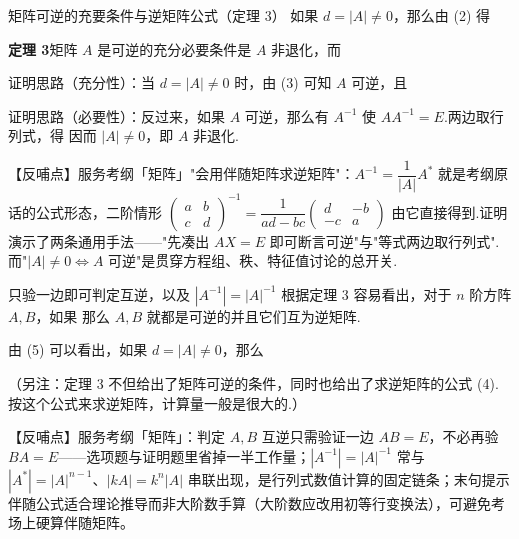 \begin{fdeep}{矩阵可逆的充要条件与逆矩阵公式（定理 3）}
如果 $d=|A|\ne 0$，那么由 (2) 得

\textbf{定理 3}\quad 矩阵 $A$ 是可逆的充分必要条件是 $A$ 非退化，而

证明思路（充分性）：当 $d=|A|\ne 0$ 时，由 (3) 可知 $A$ 可逆，且

证明思路（必要性）：反过来，如果 $A$ 可逆，那么有 $A^{-1}$ 使 $AA^{-1}=E$.两边取行列式，得
因而 $|A|\ne 0$，即 $A$ 非退化.

【反哺点】服务考纲「矩阵」"会用伴随矩阵求逆矩阵"：$A^{-1}=\dfrac{1}{|A|}A^{*}$ 就是考纲原话的公式形态，二阶情形 $\begin{pmatrix}a&b\\c&d\end{pmatrix}^{-1}=\dfrac{1}{ad-bc}\begin{pmatrix}d&-b\\-c&a\end{pmatrix}$ 由它直接得到.证明演示了两条通用手法——"先凑出 $AX=E$ 即可断言可逆"与"等式两边取行列式".而"$|A|\ne0\Leftrightarrow A$ 可逆"是贯穿方程组、秩、特征值讨论的总开关.
\end{fdeep}


\begin{fdeep}{只验一边即可判定互逆，以及 $|A^{-1}|=|A|^{-1}$}
根据定理 3 容易看出，对于 $n$ 阶方阵 $A,B$，如果
那么 $A,B$ 就都是可逆的并且它们互为逆矩阵.

由 (5) 可以看出，如果 $d=|A|\ne 0$，那么

（另注：定理 3 不但给出了矩阵可逆的条件，同时也给出了求逆矩阵的公式 (4).按这个公式来求逆矩阵，计算量一般是很大的.）

【反哺点】服务考纲「矩阵」：判定 $A,B$ 互逆只需验证一边 $AB=E$，不必再验 $BA=E$——选项题与证明题里省掉一半工作量；$|A^{-1}|=|A|^{-1}$ 常与 $|A^{*}|=|A|^{n-1}$、$|kA|=k^{n}|A|$ 串联出现，是行列式数值计算的固定链条；末句提示伴随公式适合理论推导而非大阶数手算（大阶数应改用初等行变换法），可避免考场上硬算伴随矩阵。
\end{fdeep}


